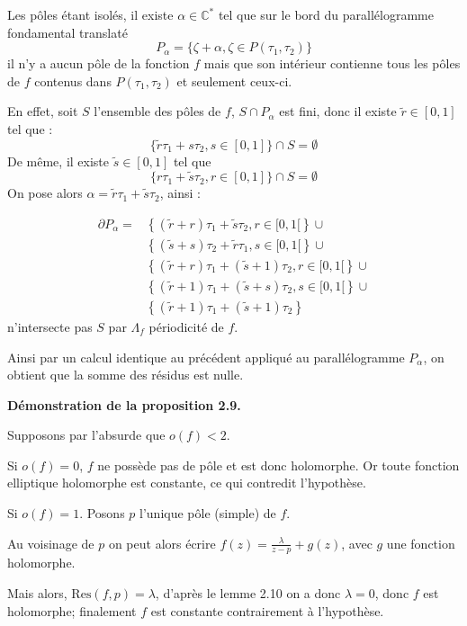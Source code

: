 \documentclass{article}
\begin{document}
Les pôles étant isolés, il existe \( \alpha \in \mathbb{C}^* \) tel que sur le bord du parallélogramme fondamental translaté
\[
P_\alpha = \{ \zeta + \alpha, \zeta \in P(\tau_1, \tau_2)\}
\]
il n’y a aucun pôle de la fonction \( f \) mais que son intérieur contienne tous les pôles de \( f \) contenus dans \( P(\tau_1, \tau_2) \) et seulement ceux-ci.

En effet, soit \( S \) l'ensemble des pôles de \( f \), \( S \cap P_\alpha \) est fini, donc il existe \(  \tilde{r} \in [0, 1] \) tel que :
\[
\{\tilde{r}\tau_1 + s\tau_2, s \in [0, 1]\} \cap S = \emptyset
\]
De même, il existe \( \tilde{s} \in [0, 1] \) tel que
\[
\{r\tau_1 + \tilde{s}\tau_2, r \in [0, 1]\} \cap S = \emptyset
\]
On pose alors \( \alpha = \tilde{r}\tau_1 + \tilde{s}\tau_2 \), ainsi :

\begin{align*}
    \partial P_\alpha = & \left\{ (\tilde{r}+r)\tau_1 + \tilde{s}\tau_2, r \in [0, 1[ \right\} \cup \\
                        & \left\{ (\tilde{s}+ s)\tau_2 + \tilde{r}\tau_1, s \in [0, 1[ \right\} \cup \\
                        & \left\{ (\tilde{r} + r)\tau_1 + (\tilde{s} + 1)\tau_2, r \in [0, 1[ \right\} \cup \\
                        & \left\{ (\tilde{r} + 1)\tau_1 + (\tilde{s} + s)\tau_2, s \in [0, 1[ \right\} \cup \\
                        & \left\{ (\tilde{r} + 1)\tau_1 + (\tilde{s} + 1)\tau_2 \right\}
    \end{align*}
n'intersecte pas \( S \) par \( \Lambda_f \) périodicité de \( f \).

Ainsi par un calcul identique au précédent appliqué au parallélogramme \( P_\alpha \), on obtient que la somme des résidus est nulle.


\textbf{Démonstration de la proposition 2.9.}

Supposons par l'absurde que \( o(f) < 2 \).

Si \( o(f) = 0 \), \( f \) ne possède pas de pôle et est donc holomorphe. Or toute fonction elliptique holomorphe est constante, ce qui contredit l'hypothèse.

Si \( o(f) = 1 \). Posons \( p \) l'unique pôle (simple) de \( f \).

Au voisinage de \( p \) on peut alors écrire \( f(z) = \frac{\lambda}{z - p} + g(z) \), avec \( g \) une fonction holomorphe.

Mais alors, \( \text{Res}(f, p) = \lambda \), d'après le lemme 2.10 on a donc \( \lambda = 0 \), donc \( f \) est holomorphe; finalement \( f \) est constante contrairement à l'hypothèse.
\end{document}
